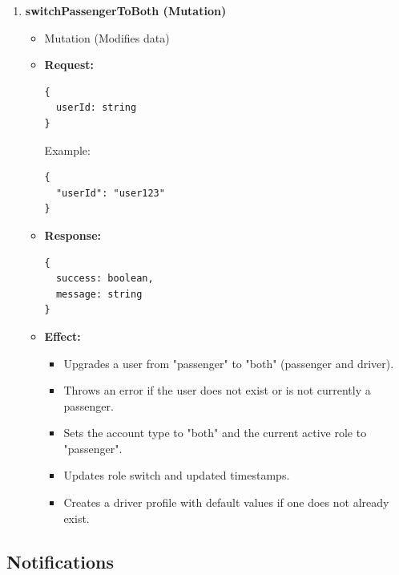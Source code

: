 \documentclass[a4paper,12pt]{article}
\begin{document}
\begin{enumerate}
\item \textbf{switchPassengerToBoth (Mutation)}
    \begin{itemize}
      \item Mutation (Modifies data)
      \item \textbf{Request:}
      \begin{verbatim}
{
  userId: string
}
      \end{verbatim}
      Example:
      \begin{verbatim}
{
  "userId": "user123"
}
      \end{verbatim}
      \item \textbf{Response:}
      \begin{verbatim}
{
  success: boolean,
  message: string
}
      \end{verbatim}
      \item \textbf{Effect:}
      \begin{itemize}
        \item Upgrades a user from "passenger" to "both" (passenger and driver).
        \item Throws an error if the user does not exist or is not currently a passenger.
        \item Sets the account type to "both" and the current active role to "passenger".
        \item Updates role switch and updated timestamps.
        \item Creates a driver profile with default values if one does not already exist.
      \end{itemize}
    \end{itemize}

\end{enumerate}

\subsection*{Notifications}
\end{document}

